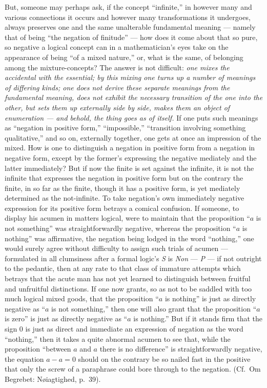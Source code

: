 \documentclass[12pt,a4paper]{book}
\begin{document}
But, someone may perhaps ask, if the concept ``infinite,'' in however many and
various connections it occurs and however many transformations it undergoes,
always preserves one and the same unalterable fundamental meaning --- namely
that of being ``the negation of finitude'' --- how does it come about that so
pure, so negative a logical concept can in a mathematician's eyes take on the
appearance of being ``of a mixed nature,'' or, what is the same, of belonging
among the mixture-concepts? The answer is not difficult: \emph{one mixes the
accidental with the essential; by this mixing one turns up a number of meanings
of differing kinds; one does not derive these separate meanings from the
fundamental meaning, does not exhibit the necessary transition of the one into
the other, but sets them up externally side by side, makes them an object of
enumeration --- and behold, the thing goes as of itself.} If one puts such
meanings as ``negation in positive form,'' ``impossible,'' ``transition
involving something qualitative,'' and so on, externally together, one gets at
once an impression of the mixed. How is one to distinguish a negation in
positive form from a negation in negative form, except by the former's
expressing the negative mediately and
the latter immediately? But if now the finite is set against the infinite, it
is not the infinite that expresses the negation in positive form but on the
contrary the finite, in so far as the finite, though it has a positive form, is
yet mediately determined as the not-infinite. To take negation's own
immediately negative expression for its positive form betrays a comical
confusion. If someone, to display his acumen in matters logical, were to
maintain that the proposition ``$a$ is not something'' was straightforwardly
negative, whereas the proposition ``$a$ is nothing'' was affirmative, the
negation being lodged in the word ``nothing,'' one would surely agree without
difficulty to assign such trials of acumen --- formulated in all clumsiness
after a formal logic's \textit{S} is \textit{Non} --- \textit{P} --- if not
outright to the pedantic, then at any rate to that class of immature attempts
which betrays that the acute man has not yet learned to distinguish between
fruitful and unfruitful distinctions. If one now grants, so as not to be
saddled with too much logical mixed goods, that the proposition ``$a$ is
nothing'' is just as directly negative as ``$a$ is not something,'' then one
will also grant that the proposition ``$a$ is zero'' is just as directly
negative as ``$a$ is nothing.'' But if it stands firm that the sign $0$ is just
as direct and immediate an expression of negation as the word ``nothing,'' then
it takes a quite abnormal acumen to see that, while the proposition ``between
$a$ and $a$ there is no difference'' is straightforwardly negative, the
equation $a - a = 0$ should on the contrary be so nailed fast in the positive
that only the screw of a paraphrase could bore through to the negation. (Cf.\
Om Begrebet: Nøiagtighed, p.~39).
\end{document}
